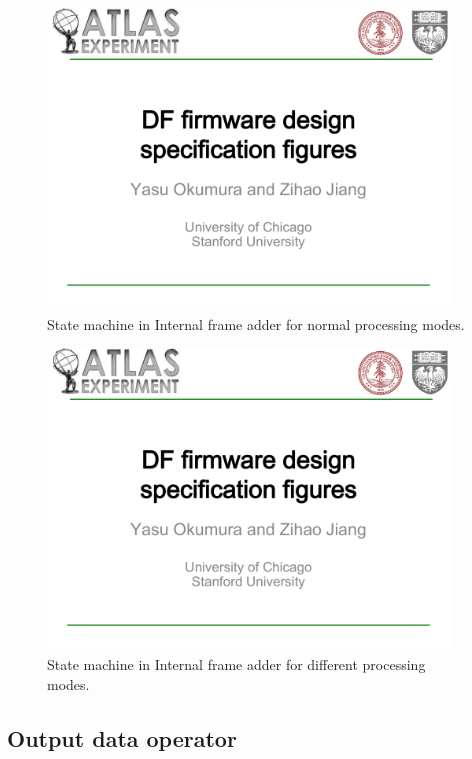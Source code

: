 \documentclass[11pt,letterpaper]{article}
\begin{document}
\begin{figure}[h!]
  \centering
  \includegraphics[width=0.95\textwidth,clip,page=9]{figures.pdf}
  \caption{State machine in Internal frame adder for normal processing modes.}
  \label{fig:STATE_MACHINE_FRAME_ADDER_NORMAL_MODES}
\end{figure}

\begin{figure}[h!]
  \centering
  \includegraphics[width=0.95\textwidth,clip,page=8]{figures.pdf}
  \caption{State machine in Internal frame adder for different processing modes.}
  \label{fig:STATE_MACHINE_FRAME_ADDER_ALL_MODES}
\end{figure}

\clearpage

\subsection{Output data operator}
\end{document}
